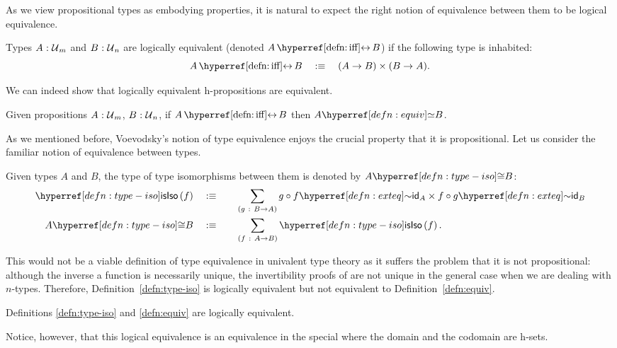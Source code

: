 As we view propositional types as embodying properties, it is natural to expect the right
notion of equivalence between them to be logical equivalence.
\begin{defn}\label{defn:iff}
  Types $A\hspace{0.1mm}:\hspace{0.1mm}\mathcal{U}{}_m$ and $B\hspace{0.1mm}:\hspace{0.1mm}\mathcal{U}{}_n$ are logically equivalent
  (denoted $\logequiv{A}{B}$) if the following type is inhabited:
  \begin{equation*}
    \logequiv{A}{B} \quad\is\quad (A \rightarrow B) \times (B \rightarrow A).
  \end{equation*}
\end{defn}

We can indeed show that logically equivalent h-propositions are equivalent.
\begin{prop}\label{prop:iff-equiv}
  Given propositions $A\hspace{0.1mm}:\hspace{0.1mm}\mathcal{U}{}_m$, $B\hspace{0.1mm}:\hspace{0.1mm}\mathcal{U}{}_n$, if $\logequiv{A}{B}$
  then $\typequiv{A}{B}$.
\end{prop}

As we mentioned before, Voevodsky's notion of type equivalence enjoys the crucial property
that it is propositional. Let us consider the familiar notion of equivalence between
types.
\begin{defn}\label{defn:type-iso}
  Given types $A$ and $B$, the type of type isomorphisms between them is denoted by
  $\typiso{A}{B}$:
  \begin{alignat*}{2}
    \istypiso{f}   \quad&\is\quad && \sigmaty{g}{B \rightarrow A}{\exteq{g \circ f}{\idfn{A}} \times \exteq{f \circ g}{\idfn{B}}} \\
    \typiso{A}{B} \quad&\is\quad &&\sigmaty{f}{A \rightarrow B}{\istypiso{f}}                          .
  \end{alignat*}
\end{defn}

This would not be a viable definition of type equivalence in univalent type theory as it
suffers the problem that it is not propositional: although the inverse a function is
necessarily unique, the invertibility proofs of are not unique in the general case when we
are dealing with $n$-types. Therefore, Definition~\ref{defn:type-iso} is logically
equivalent but not equivalent to Definition~\ref{defn:equiv}.

\begin{prop}\label{prop:iso-equiv-equiv}
  Definitions \ref{defn:type-iso} and \ref{defn:equiv} are logically equivalent.
\end{prop}


Notice, however, that this logical equivalence is an equivalence in the special where the
domain and the codomain are h-sets.

